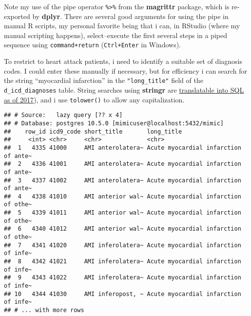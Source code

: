 \documentclass[]{article}
\newenvironment{Shaded}{\begin{snugshade}}{\end{snugshade}}
\newcommand{\KeywordTok}[1]{\textcolor[rgb]{0.13,0.29,0.53}{\textbf{#1}}}
\newcommand{\StringTok}[1]{\textcolor[rgb]{0.31,0.60,0.02}{#1}}
\newcommand{\OperatorTok}[1]{\textcolor[rgb]{0.81,0.36,0.00}{\textbf{#1}}}
\newcommand{\NormalTok}[1]{#1}
\begin{document}
Note my use of the pipe operator \texttt{\%\textgreater{}\%} from the
\textbf{magrittr} package, which is re-exported by \textbf{dplyr}. There
are several good arguments for using the pipe in manual R scripts, my
personal favorite being that i can, in RStudio (where my manual
scripting happens), select--execute the first several steps in a piped
sequence using \texttt{command+return} (\texttt{Ctrl+Enter} in Windows).

To restrict to heart attack patients, i need to identify a suitable set
of diagnosis codes. I could enter these manually if necessary, but for
efficiency i can search for the string ``myocardial infarction'' in the
\texttt{"long\_title"} field of the \texttt{d\_icd\_diagnoses} table.
String searches using \textbf{stringr} are
\href{https://github.com/tidyverse/dbplyr/pull/35}{translatable into SQL
as of 2017}), and i use \texttt{tolower()} to allow any capitalization.

\begin{Shaded}
\end{Shaded}

\begin{verbatim}
## # Source:   lazy query [?? x 4]
## # Database: postgres 10.5.0 [mimicuser@localhost:5432/mimic]
##    row_id icd9_code short_title       long_title                          
##     <int> <chr>     <chr>             <chr>                               
##  1   4335 41000     AMI anterolatera~ Acute myocardial infarction of ante~
##  2   4336 41001     AMI anterolatera~ Acute myocardial infarction of ante~
##  3   4337 41002     AMI anterolatera~ Acute myocardial infarction of ante~
##  4   4338 41010     AMI anterior wal~ Acute myocardial infarction of othe~
##  5   4339 41011     AMI anterior wal~ Acute myocardial infarction of othe~
##  6   4340 41012     AMI anterior wal~ Acute myocardial infarction of othe~
##  7   4341 41020     AMI inferolatera~ Acute myocardial infarction of infe~
##  8   4342 41021     AMI inferolatera~ Acute myocardial infarction of infe~
##  9   4343 41022     AMI inferolatera~ Acute myocardial infarction of infe~
## 10   4344 41030     AMI inferopost, ~ Acute myocardial infarction of infe~
## # ... with more rows
\end{verbatim}
\end{document}
